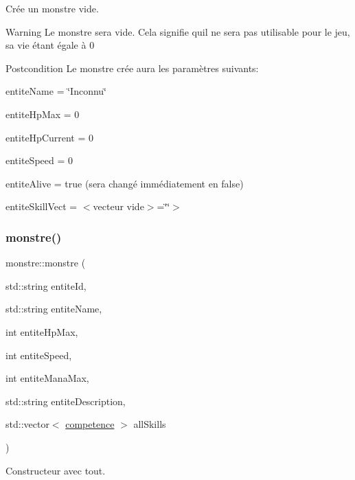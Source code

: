 Crée un monstre vide. \begin{DoxyWarning}{Warning}
Le monstre sera vide. Cela signifie qu\textquotesingle{}il ne sera pas utilisable pour le jeu, sa vie étant égale à 0 
\end{DoxyWarning}
\begin{DoxyPostcond}{Postcondition}
Le monstre crée aura les paramètres suivants\+:
\begin{DoxyItemize}
\item entite\+Name = \char`\"{}\+Inconnu\char`\"{}
\item entite\+Hp\+Max = 0
\item entite\+Hp\+Current = 0
\item entite\+Speed = 0
\item entite\+Alive = true (sera changé immédiatement en false)
\item entite\+Skill\+Vect = $<$vecteur vide$>$=\char`\"{}\char`\"{}$>$ 
\end{DoxyItemize}
\end{DoxyPostcond}
\mbox{\label{classmonstre_a863d9f9a553a2e3a49d16182dd004da8}} 
\subsubsection{\texorpdfstring{monstre()}{monstre()}\hspace{0.1cm}{\footnotesize\ttfamily [2/2]}}
{\footnotesize\ttfamily monstre\+::monstre (\begin{DoxyParamCaption}\item[{std\+::string}]{entite\+Id,  }\item[{std\+::string}]{entite\+Name,  }\item[{int}]{entite\+Hp\+Max,  }\item[{int}]{entite\+Speed,  }\item[{int}]{entite\+Mana\+Max,  }\item[{std\+::string}]{entite\+Description,  }\item[{std\+::vector$<$ \hyperlink{classcompetence}{competence} $>$}]{all\+Skills }\end{DoxyParamCaption})\hspace{0.3cm}{\ttfamily [inline]}}



Constructeur avec tout. 


